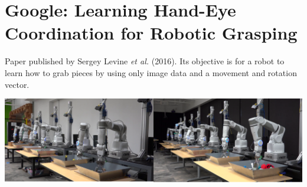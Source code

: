 
\section{Google: Learning Hand-Eye Coordination for Robotic Grasping}

\begin{frame}{\insertsec}
Paper published by Sergey Levine \emph{et al.} (2016).
Its objective is for a robot to learn how to grab pieces by using only image data and a movement
and rotation vector.

\begin{center}
    \includegraphics[width=.9\textwidth]{images/google_robot}
\end{center}


\end{frame}